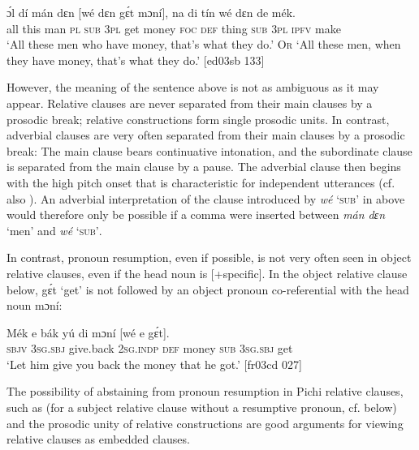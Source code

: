 \ea%
    \label{ex:key:1420}
    \gll ɔ́l  dí  mán    dɛn  [wé  dɛn  gɛ́t  mɔní],  na  di  tín
wé  dɛn  de  mék.\\
all  this  man    \textsc{pl}   \textsc{sub}  \textsc{3pl}  get  money    \textsc{foc}  \textsc{def}  thing
\textsc{sub}  \textsc{3pl}  \textsc{ipfv}  make\\

\glt ‘All these men who have money, that’s what they do.’ \textsc{Or} 
‘All these men, when they have money, that’s what they do.’ [ed03sb 133]
\z

However, the meaning of the sentence above is not as ambiguous as it may appear. Relative clauses are never separated from their main clauses by a prosodic break; relative constructions form single prosodic units. In contrast, adverbial clauses are very often separated from their main clauses by a prosodic break: The main clause bears continuative intonation, and the subordinate clause is separated from the main clause by a pause. The adverbial clause then begins with the high pitch onset that is characteristic for independent utterances (cf. also ). An adverbial interpretation of the clause introduced by \textit{wé} ‘\textsc{sub’} in  above would therefore only be possible if a comma were inserted between \textit{mán dɛn} ‘men’ and \textit{wé} ‘\textsc{sub’}. 


In contrast, pronoun resumption, even if possible, is not very often seen in object relative clauses, even if the head noun is [+specific]. In the object relative clause below, gɛ́t ‘get’ is not followed by an object pronoun co-referential with the head noun mɔní:



\ea%
    \label{ex:key:1421}
    \gll Mék    e    bák      yú    di  mɔní  [wé  e    gɛ́t].\\
\textsc{sbjv}    \textsc{3sg.sbj}  give.back  \textsc{2sg.indp}  \textsc{def}  money   \textsc{sub}  \textsc{3sg.sbj}  get\\

\glt ‘Let him give you back the money that he got.’ [fr03cd 027]
\z

The possibility of abstaining from pronoun resumption in Pichi relative clauses, such as  (for a subject relative clause without a resumptive pronoun, cf.  below) and the prosodic unity of relative constructions are good arguments for viewing relative clauses as embedded clauses.


